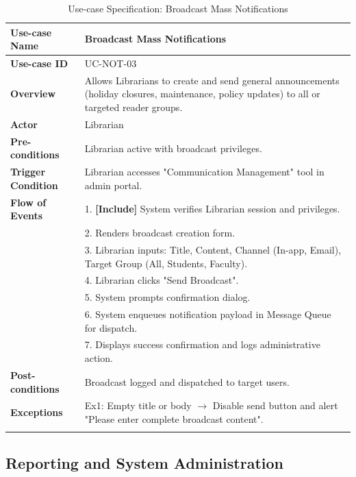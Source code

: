 \begin{longtable}{|p{3.5cm}|p{11.5cm}|}
    \hline
    \textbf{Use-case Name} & \textbf{Broadcast Mass Notifications} \\
    \hline
    \textbf{Use-case ID} & UC-NOT-03 \\
    \hline
    \textbf{Overview} & Allows Librarians to create and send general announcements (holiday closures, maintenance, policy updates) to all or targeted reader groups. \\
    \hline
    \textbf{Actor} & Librarian \\
    \hline
    \textbf{Pre-conditions} & Librarian active with broadcast privileges. \\
    \hline
    \textbf{Trigger Condition} & Librarian accesses "Communication Management" tool in admin portal. \\
    \hline
    \textbf{Flow of Events} & 
    1. \textbf{[Include]} System verifies Librarian session and privileges.\\ 
 & 
    2. Renders broadcast creation form.\\ 
 & 
    3. Librarian inputs: Title, Content, Channel (In-app, Email), Target Group (All, Students, Faculty).\\ 
 & 
    4. Librarian clicks "Send Broadcast".\\ 
 & 
    5. System prompts confirmation dialog.\\ 
 & 
    6. System enqueues notification payload in Message Queue for dispatch.\\ 
 & 
    7. Displays success confirmation and logs administrative action. \\
    \hline
    \textbf{Post-conditions} & Broadcast logged and dispatched to target users. \\
    \hline
    \textbf{Exceptions} & 
    Ex1: Empty title or body $\rightarrow$ Disable send button and alert "Please enter complete broadcast content". \\
    \hline
    \caption{Use-case Specification: Broadcast Mass Notifications} \\
\end{longtable}

\subsection{Reporting and System Administration}

